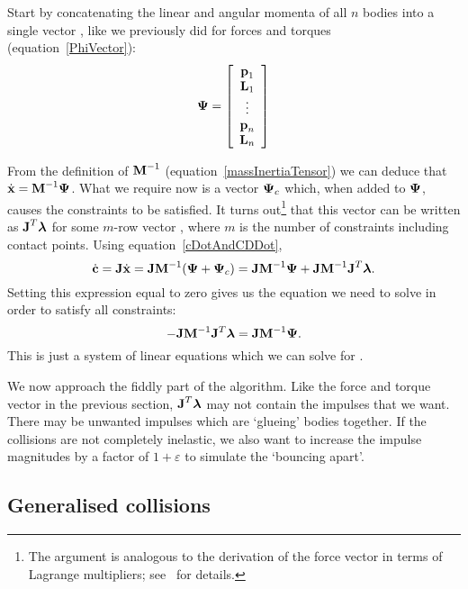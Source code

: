 Start by concatenating the linear and angular momenta of all $n$ bodies into a single vector
\ve{\Psi}, like we previously did for forces and torques (equation~\ref{PhiVector}):
\begin{equation} \label{PsiVector}
\ve{\Psi} = \left[\begin{array}{c}
    \ve{p}_1 \\ \ve{L}_1 \\ \vdots \\ \ve{p}_n \\ \ve{L}_n \end{array}\right]
\end{equation}

From the definition of $\m{M}^{-1}$ (equation~\ref{massInertiaTensor}) we can deduce that
$\dot{\ve{x}} = \m{M}^{-1}\ve{\Psi}$. What we require now is a vector $\ve{\Psi}_c$ which, when
added to $\ve{\Psi}$, causes the constraints to be satisfied. It turns out\footnote{The argument
is analogous to the derivation of the force vector in terms of Lagrange multipliers;
see~\cite{BaraffWitkin:97} for details.} that this vector can be written as $\m{J}^T\ve{\lambda}$
for some $m$-row vector \ve{\lambda}, where $m$ is the number of constraints including contact
points. Using equation~\ref{cDotAndCDDot},
\begin{equation}
\dot{\ve{c}} = \m{J}\dot{\ve{x}} = \m{J}\m{M}^{-1}(\ve{\Psi} + \ve{\Psi}_c) =
    \m{J}\m{M}^{-1}\ve{\Psi} + \m{J}\m{M}^{-1}\m{J}^T\ve{\lambda}.
\end{equation}
Setting this expression equal to zero gives us the equation we need to solve in order to satisfy
all constraints:
\begin{equation}
-\m{J}\m{M}^{-1}\m{J}^T\ve{\lambda} = \m{J}\m{M}^{-1}\ve{\Psi}.
\end{equation}
This is just a system of linear equations which we can solve for \ve{\lambda}.

We now approach the fiddly part of the algorithm. Like the force and torque vector in the previous
section, $\m{J}^T\ve{\lambda}$ may not contain the impulses that we want. There may be unwanted
impulses which are `glueing' bodies together. If the collisions are not completely inelastic, we
also want to increase the impulse magnitudes by a factor of $1 + \varepsilon$ to simulate the
`bouncing apart'.



\subsection{Generalised collisions}
